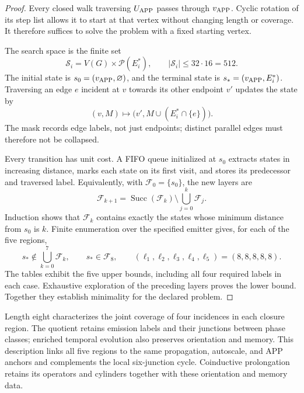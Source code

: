 \begin{proof}
Every closed walk traversing \(U_{\rm APP}\) passes through
\(v_{\rm APP}\). Cyclic rotation of its step list allows it to start at
that vertex without changing length or coverage. It therefore suffices
to solve the problem with a fixed starting vertex.

The search space is the finite set
\[
 \mathscr S_i=V(G)\times\mathcal P(E_i^*),
 \qquad |\mathscr S_i|\le32\cdot16=512.
\]
The initial state is \(s_0=(v_{\rm APP},\varnothing)\), and the terminal
state is \(s_*=(v_{\rm APP},E_i^*)\). Traversing an edge \(e\)
incident at \(v\) towards its other endpoint \(v'\) updates the state by
\begin{equation}
 (v,M)\longmapsto\bigl(v',M\cup(E_i^*\cap\{e\})\bigr).
 \label{regcl27:transicion-bfs}
\end{equation}
The mask records edge labels, not just endpoints; distinct parallel
edges must therefore not be collapsed.

Every transition has unit cost. A FIFO queue initialized at \(s_0\)
extracts states in increasing distance, marks each state on its first
visit, and stores its predecessor and traversed label.
Equivalently, with \(\mathcal F_0=\{s_0\}\), the new layers are
\[
 \mathcal F_{k+1}
 =\operatorname{Succ}(\mathcal F_k)
   \setminus\bigcup_{j=0}^{k}\mathcal F_j.
\]
Induction shows that \(\mathcal F_k\) contains exactly the states whose
minimum distance from \(s_0\) is \(k\). Finite enumeration over the
specified emitter gives, for each of the five regions,
\[
 s_*\notin\bigcup_{k=0}^{7}\mathcal F_k,\qquad s_*\in\mathcal F_8,
 \qquad (\ell_1,\ell_2,\ell_3,\ell_4,\ell_5)=(8,8,8,8,8).
\]
The tables exhibit the five upper bounds, including all four required
labels in each case. Exhaustive exploration of the preceding layers
proves the lower bound. Together they establish minimality for the
declared problem.
\end{proof}

Length eight characterizes the joint coverage of four incidences in
each closure region. The quotient retains emission labels and their
junctions between phase classes; enriched temporal evolution also
preserves orientation and memory. This description links all five
regions to the same propagation, autoscale, and APP anchors and
complements the local six-junction cycle. Coinductive prolongation
retains its operators and cylinders together with these orientation
and memory data.
